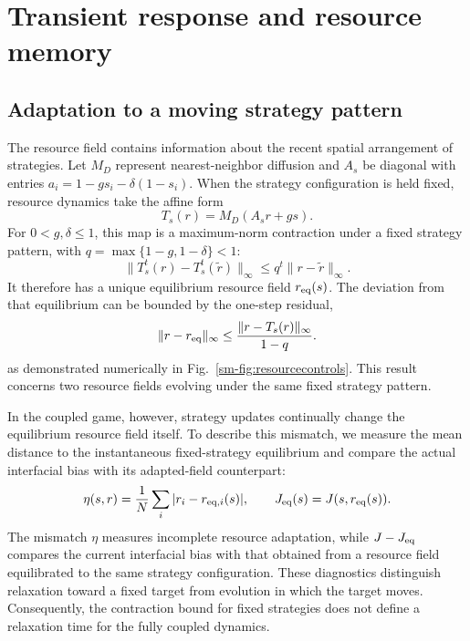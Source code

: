 \section{Transient response and resource memory}

\subsection{Adaptation to a moving strategy pattern}

The resource field contains information about the recent spatial arrangement of strategies. Let $M_D$ represent nearest-neighbor diffusion and $A_s$ be diagonal with entries $a_i=1-gs_i-\delta(1-s_i)$. When the strategy configuration is held fixed, resource dynamics take the affine form
\begin{equation}
\label{eq:affine_map}
T_s(r)=M_D(A_s r+g s).
\end{equation}
For $0<g,\delta\le1$, this map is a maximum-norm contraction under a fixed strategy pattern, with $q=\max\{1-g,1-\delta\}<1$:
\begin{equation}
\label{eq:contraction}
\|T_s^t(r)-T_s^t(\widetilde r)\|_\infty
\le q^t\|r-\widetilde r\|_\infty.
\end{equation}
It therefore has a unique equilibrium resource field $r_{\rm eq}(s)$. The deviation from that equilibrium can be bounded by the one-step residual,
\begin{equation}
\label{eq:equilibrium_error}
\|r-r_{\rm eq}\|_\infty
\le\frac{\|r-T_s(r)\|_\infty}{1-q}.
\end{equation}
as demonstrated numerically in Fig.~\ref{sm-fig:resourcecontrols}. This result concerns two resource fields evolving under the same fixed strategy pattern.

In the coupled game, however, strategy updates continually change the equilibrium resource field itself. To describe this mismatch, we measure the mean distance to the instantaneous fixed-strategy equilibrium and compare the actual interfacial bias with its adapted-field counterpart:
\begin{equation}
\label{eq:adaptation}
\eta(s,r)=\frac1N\sum_i|r_i-r_{{\rm eq},i}(s)|,
\qquad J_{\rm eq}(s)=J(s,r_{\rm eq}(s)).
\end{equation}
The mismatch $\eta$ measures incomplete resource adaptation, while $J-J_{\rm eq}$ compares the current interfacial bias with that obtained from a resource field equilibrated to the same strategy configuration. These diagnostics distinguish relaxation toward a fixed target from evolution in which the target moves. Consequently, the contraction bound for fixed strategies does not define a relaxation time for the fully coupled dynamics.

